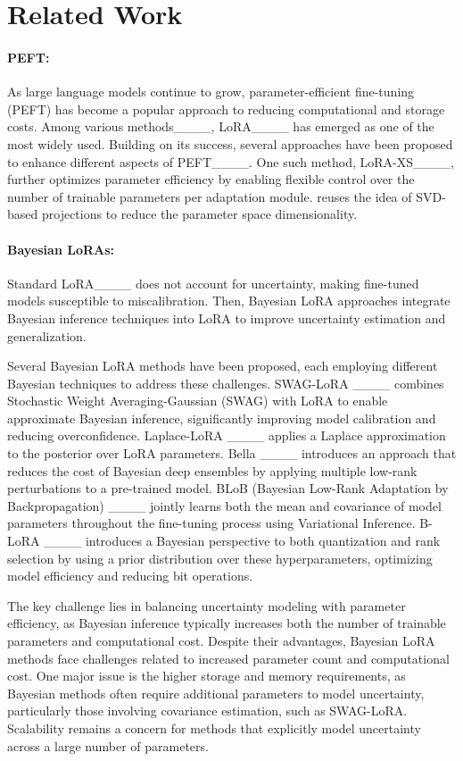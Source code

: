 \section{Related Work}
\paragraph{PEFT:} As large language models continue to grow, parameter-efficient fine-tuning (PEFT) has become a popular approach to reducing computational and storage costs. Among various methods____, LoRA____ has emerged as one of the most widely used. 
Building on its success, several approaches have been proposed to enhance different aspects of PEFT____. One such method, LoRA-XS____, further optimizes parameter efficiency by enabling flexible control over the number of trainable parameters per adaptation module. 
\our{} reuses the idea of SVD-based projections to reduce the parameter space dimensionality. 

\paragraph{Bayesian LoRAs:} Standard LoRA____ does not account for uncertainty, making fine-tuned models susceptible to miscalibration. Then, Bayesian LoRA approaches integrate Bayesian inference techniques into LoRA to improve uncertainty estimation and generalization.

Several Bayesian LoRA methods have been proposed, each employing different Bayesian techniques to address these challenges.  SWAG-LoRA ____ combines Stochastic Weight Averaging-Gaussian (SWAG) with LoRA to enable approximate Bayesian inference, significantly improving model calibration and reducing overconfidence. Laplace-LoRA ____ applies a Laplace approximation to the posterior over LoRA parameters. Bella ____ introduces an approach that reduces the cost of Bayesian deep ensembles by applying multiple low-rank perturbations to a pre-trained model.
%
BLoB (Bayesian Low-Rank Adaptation by Backpropagation) ____ jointly learns both the mean and covariance of model parameters throughout the fine-tuning process using Variational Inference. B-LoRA ____ introduces a Bayesian perspective to both quantization and rank selection by using a prior distribution over these hyperparameters, optimizing model efficiency and reducing bit operations.

 The key challenge lies in balancing uncertainty modeling with parameter efficiency, as Bayesian inference typically increases both the number of trainable parameters and computational cost.
Despite their advantages, Bayesian LoRA methods face challenges related to increased parameter count and computational cost. One major issue is the higher storage and memory requirements, as Bayesian methods often require additional parameters to model uncertainty, particularly those involving covariance estimation, such as SWAG-LoRA. 
Scalability remains a concern for methods that explicitly model uncertainty across a large number of parameters.


